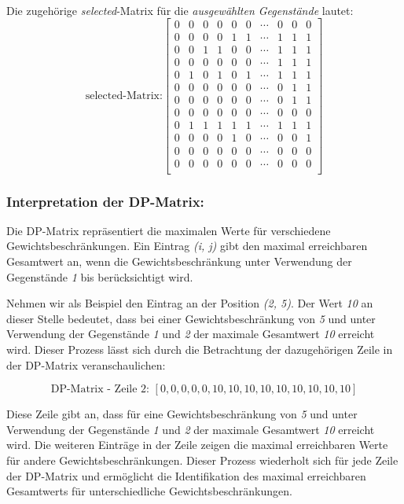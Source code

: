 \\
Die zugehörige \textit{selected}-Matrix für die \textit{ausgewählten Gegenstände} lautet:
\[
    \text{selected-Matrix:}
    \begin{bmatrix}
        0 & 0 & 0 & 0 & 0 & 0 & \cdots & 0 & 0 & 0 \\
        0 & 0 & 0 & 0 & 1 & 1 & \cdots & 1 & 1 & 1 \\
        0 & 0 & 1 & 1 & 0 & 0 & \cdots & 1 & 1 & 1 \\
        0 & 0 & 0 & 0 & 0 & 0 & \cdots & 1 & 1 & 1 \\
        0 & 1 & 0 & 1 & 0 & 1 & \cdots & 1 & 1 & 1 \\
        0 & 0 & 0 & 0 & 0 & 0 & \cdots & 0 & 1 & 1 \\
        0 & 0 & 0 & 0 & 0 & 0 & \cdots & 0 & 1 & 1 \\
        0 & 0 & 0 & 0 & 0 & 0 & \cdots & 0 & 0 & 0 \\
        0 & 1 & 1 & 1 & 1 & 1 & \cdots & 1 & 1 & 1 \\
        0 & 0 & 0 & 0 & 1 & 0 & \cdots & 0 & 0 & 1 \\
        0 & 0 & 0 & 0 & 0 & 0 & \cdots & 0 & 0 & 0 \\
        0 & 0 & 0 & 0 & 0 & 0 & \cdots & 0 & 0 & 0 \\
    \end{bmatrix}
\]

\subsubsection*{Interpretation der DP-Matrix:}
Die DP-Matrix repräsentiert die maximalen Werte für verschiedene Gewichtsbeschränkungen. Ein Eintrag \textit{(i, j)} gibt
den maximal erreichbaren Gesamtwert an, wenn die Gewichtsbeschränkung  unter Verwendung der Gegenstände \textit{1} bis
 berücksichtigt wird.

Nehmen wir als Beispiel den Eintrag an der Position \textit{(2, 5)}. Der Wert \textit{10} an dieser Stelle bedeutet, dass bei
einer Gewichtsbeschränkung von \textit{5} und unter Verwendung der Gegenstände \textit{1} und \textit{2} der maximale Gesamtwert \textit{10}
erreicht wird. Dieser Prozess lässt sich durch die Betrachtung der dazugehörigen Zeile in der DP-Matrix veranschaulichen:

\[
    \text{DP-Matrix - Zeile 2: } [0, 0, 0, 0, 0, 10, 10, 10, 10, 10, 10, 10, 10, 10]
\]

Diese Zeile gibt an, dass für eine Gewichtsbeschränkung von \textit{5} und unter Verwendung der Gegenstände \textit{1} und \textit{2}
der maximale Gesamtwert \textit{10} erreicht wird. Die weiteren Einträge in der Zeile zeigen die maximal erreichbaren Werte
für andere Gewichtsbeschränkungen. Dieser Prozess wiederholt sich für jede Zeile der DP-Matrix und ermöglicht die
Identifikation des maximal erreichbaren Gesamtwerts für unterschiedliche Gewichtsbeschränkungen.

